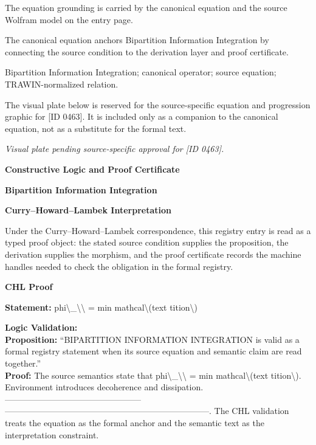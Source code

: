 The equation grounding is carried by the canonical equation and the source Wolfram model on the entry page.

The canonical equation anchors Bipartition Information Integration by connecting the source condition to the derivation layer and proof certificate.

Bipartition Information Integration; canonical operator; source equation; TRAWIN-normalized relation.
\endgroup

\begingroup\footnotesize\sloppy
The visual plate below is reserved for the source-specific equation and progression graphic for [ID 0463]. It is included only as a companion to the canonical equation, not as a substitute for the formal text.
\par\endgroup
\begingroup\footnotesize\itshape
Visual plate pending source-specific approval for [ID 0463].
\par\endgroup

\clearpage
\begingroup\tzpsupportsetup
\noindent\textbf{\fontsize{10.8pt}{12.8pt}\selectfont [ID 0463] Constructive Logic and Proof Certificate}\par
\noindent\textbf{\fontsize{10pt}{12pt}\selectfont Bipartition Information Integration}\par
\vspace{0.45em}
\begingroup
\footnotesize
\setlength{\parskip}{0.22em}
\setlength{\parindent}{0pt}
\noindent\textbf{Curry--Howard--Lambek Interpretation}\par
Under the Curry--Howard--Lambek correspondence, this registry entry is read as a typed proof
object: the stated source condition supplies the proposition, the derivation supplies the
morphism, and the proof certificate records the machine handles needed to check the obligation
in the formal registry.

\vspace{0.45em}
\noindent\textbf{CHL Proof}\par
\textbf{Statement:} phi\textbackslash{}\_\textbackslash{}\textbackslash{} = min mathcal\textbackslash{}(text tition\textbackslash{})

\textbf{Logic Validation:}\\
\textbf{Proposition:} ``BIPARTITION INFORMATION INTEGRATION is valid as a formal registry statement when its
source equation and semantic claim are read together.''\\
\textbf{Proof:} The source semantics state that phi\textbackslash{}\_\textbackslash{}\textbackslash{} = min mathcal\textbackslash{}(text tition\textbackslash{}). Environment
introduces decoherence and dissipation. ------------------------------------------------
------------------------------------------------------------------------. The CHL
validation treats the equation as the formal anchor and the semantic text as the
interpretation constraint.


